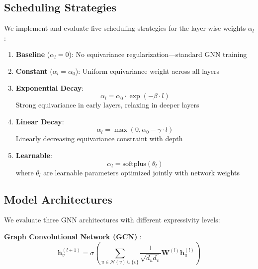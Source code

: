 \documentclass[11pt,a4paper]{article}
\begin{document}
\subsection{Scheduling Strategies}

We implement and evaluate five scheduling strategies for the layer-wise weights $\alpha_l$:

\begin{enumerate}
    \item \textbf{Baseline} ($\alpha_l = 0$): No equivariance regularization---standard GNN training
    
    \item \textbf{Constant} ($\alpha_l = \alpha_0$): Uniform equivariance weight across all layers
    
    \item \textbf{Exponential Decay}: 
    \begin{equation}
        \alpha_l = \alpha_0 \cdot \exp(-\beta \cdot l)
    \end{equation}
    Strong equivariance in early layers, relaxing in deeper layers
    
    \item \textbf{Linear Decay}:
    \begin{equation}
        \alpha_l = \max(0, \alpha_0 - \gamma \cdot l)
    \end{equation}
    Linearly decreasing equivariance constraint with depth
    
    \item \textbf{Learnable}: 
    \begin{equation}
        \alpha_l = \text{softplus}(\theta_l)
    \end{equation}
    where $\theta_l$ are learnable parameters optimized jointly with network weights
\end{enumerate}

\subsection{Model Architectures}

We evaluate three GNN architectures with different expressivity levels:

\textbf{Graph Convolutional Network (GCN)} \cite{kipf2017gcn}:
\begin{equation}
    \mathbf{h}_v^{(l+1)} = \sigma\left( \sum_{u \in \mathcal{N}(v) \cup \{v\}} \frac{1}{\sqrt{d_u d_v}} \mathbf{W}^{(l)} \mathbf{h}_u^{(l)} \right)
\end{equation}
\end{document}
